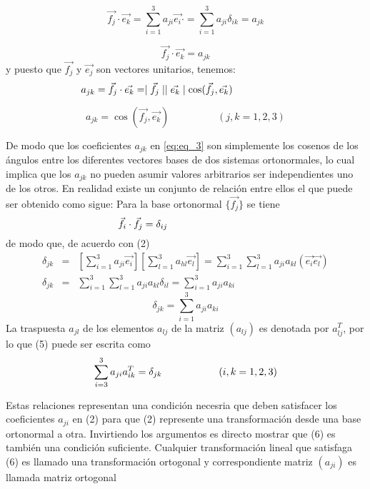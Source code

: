 $$ 
\vec{f_j}\cdot\vec{e_k}=\sum^{3}_{i=1}a_{ji}\vec{e_i}\cdot=\sum^{3}_{i=1}a_{ji}\delta_{ik}=a_{jk}
$$

\begin{equation}
    \vec{f_j}\cdot\vec{e_k}=a_{jk}
    \label{eq:eq_3}
  \end{equation}
y puesto que $\vec{f_j}$ y $\vec{e_j}$ son vectores unitarios, tenemos:
$$a_{jk}=\vec{f_j}\cdot\vec{e_k}=\mid\vec{f_j}\mid\mid\vec{e_k}\mid\cos(\vec{f_j},\vec{e_k})\hspace{2 cm}
$$

\begin{equation}
  a_{jk}=\cos(\vec{f_j},\vec{e_k})\hspace{2cm}(j,k=1,2,3)
  \label{eq:eq_4}
\end{equation}

De modo que los coeficientes $a_{jk}$ en \eqref{eq:eq_3} son simplemente los cosenos de los ángulos entre los diferentes vectores bases de dos sistemas ortonormales, lo cual implica que los $a_{jk}$ no pueden asumir valores arbitrarios ser independientes uno de los otros. En realidad existe un conjunto de relación entre ellos el que puede ser obtenido como sigue:
Para la base ortonormal $\{\vec{f_j}\}$ se tiene
$$
  \vec{f_i}\cdot\vec{f_j}=\delta_{ij}\hspace{3 cm}
$$
de modo que, de acuerdo con (2)
\begin{eqnarray*}
    \delta_{jk}&=&\left[\sum^{3}_{i=1}a_{ji}\vec{e_i}\right]\left[\sum^{3}_{l=1}a_{hl}\vec{e_l}\right]=\sum^{3}_{i=1}\sum^{3}_{l=1}a_{ji}a_{kl}(\vec{e_i}\vec{e_l})\\
    \delta_{jk}&=&\sum^{3}_{i=1}\sum^{3}_{l=1}a_{ji}a_{kl}\delta_{il}=\sum^{3}_{i=1}a_{ji}a_{ki}
  \end{eqnarray*}
\begin{equation}
  \delta_{jk}=\sum^{3}_{i=1}a_{ji}a_{ki}  
  \label{eq:eq_5}
\end{equation}
La traspuesta $a_{jl}$ de los elementos $a_{lj}$ de la matriz $(a_{lj})$ es denotada por $a^T_{lj}$, por lo que (5) puede ser escrita como
\begin{equation}
    \sum^{3}_{i=3}a_{ji}a^{T}_{ik}=\delta_{jk}\hspace{2 cm}(i,k=1,2,3)
    \label{eq:eq_5}
\end{equation}

Estas relaciones representan una condición necesria que deben satisfacer los coeficientes $a_{ji}$ en (2) para que (2) represente una transformación desde una base ortonormal a otra. Invirtiendo los argumentos es directo mostrar que (6) es también una condición suficiente. Cualquier transformación lineal que satisfaga (6) es llamado una transformación ortogonal y correspondiente matriz $(a_{ji})$ es llamada matriz ortogonal

